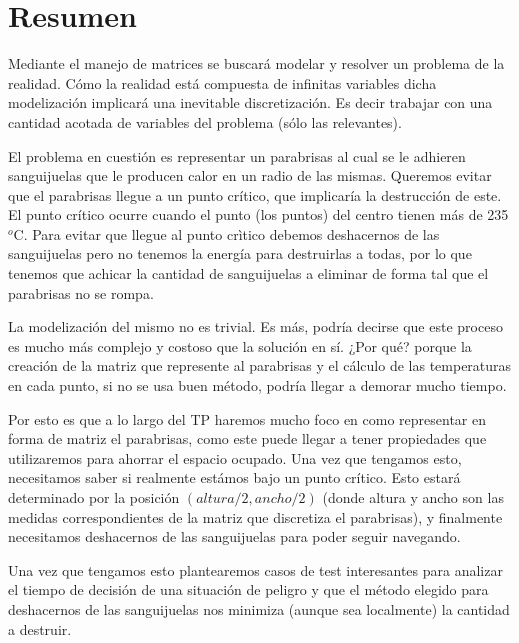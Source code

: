 \section{Resumen}

Mediante el manejo de matrices se buscará modelar y resolver un problema de la realidad. Cómo la realidad está compuesta de infinitas variables dicha modelización implicará una inevitable discretización. Es decir trabajar con una 
cantidad acotada de variables del problema (sólo las relevantes).

El problema en cuestión es representar un parabrisas al cual se le adhieren sanguijuelas que le producen calor en un radio de las mismas. Queremos evitar que el parabrisas llegue a un punto crítico, que implicaría la destrucción de este. El punto crítico ocurre cuando el punto (los puntos) del centro tienen más de 235${}^o$C. Para evitar que llegue al punto crìtico debemos deshacernos de las sanguijuelas pero no tenemos la energía para destruirlas a todas, por lo que tenemos que achicar la cantidad de sanguijuelas a eliminar de forma tal que el parabrisas no se rompa.

La modelización del mismo no es trivial. Es más, podría decirse que este proceso es mucho más complejo y costoso que la solución en sí. ¿Por qué? porque la creación de la matriz que represente al parabrisas y el cálculo de las temperaturas en cada punto, si no se usa buen método, podría llegar a demorar mucho tiempo. 

Por esto es que a lo largo del TP haremos mucho foco en como representar en forma de matriz el parabrisas, como este puede llegar a tener propiedades que utilizaremos para ahorrar el espacio ocupado. Una vez que tengamos esto, necesitamos saber si realmente estámos bajo un punto crítico. Esto estará determinado por la posición $(altura/2,ancho/2)$ (donde altura y ancho son las medidas correspondientes de la matriz que discretiza el parabrisas), y finalmente necesitamos deshacernos de las sanguijuelas para poder seguir navegando.

Una vez que tengamos esto plantearemos casos de test interesantes para analizar el tiempo de decisión de una situación de peligro y que el método elegido para deshacernos de las sanguijuelas nos minimiza (aunque sea localmente) la cantidad a destruir.


